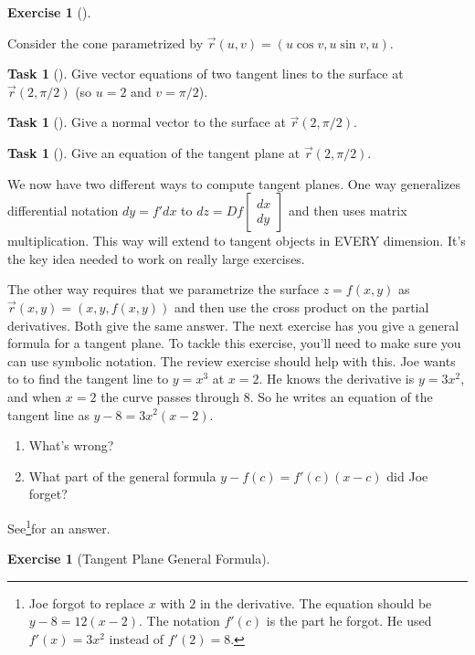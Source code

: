 \documentclass[10pt,]{book}
\theoremstyle{plain}
\theoremstyle{definition}
\theoremstyle{definition}
\theoremstyle{definition}
\theoremstyle{definition}
\newtheorem{exploration}[project]{Exercise}
\newtheorem{task}[project]{Task}
\theoremstyle{definition}
\numberwithin{equation}{section}
\begin{document}
\begin{exploration}[]\label{exploration-147}
%
\par
Consider the cone parametrized by \(\vec r(u,v)=(u\cos v, u\sin v,u)\).%
\begin{task}[]\label{task-330}
Give vector equations of two tangent lines to the surface at \(\vec r(2,\pi/2)\) (so \(u=2\) and \(v=\pi/2\)).%
\end{task}
\begin{task}[]\label{task-331}
Give a normal vector to the surface at \(\vec r(2,\pi/2)\).%
\end{task}
\begin{task}[]\label{task-332}
Give an equation of the tangent plane at \(\vec r(2,\pi/2)\).%
\end{task}
\end{exploration}
We now have two different ways to compute tangent planes. One way generalizes differential notation \(dy=f'dx\) to \(dz = Df \begin{bmatrix}dx\\dy
\end{bmatrix}\) and then uses matrix multiplication. This way will extend to tangent objects in EVERY dimension. It's the key idea needed to work on really large exercises.%
\par
The other way requires that we parametrize the surface \(z=f(x,y)\) as \(\vec r(x,y)=(x,y,f(x,y))\) and then use the cross product on the partial derivatives. Both give the same answer. The next exercise has you give a general formula for a tangent plane. To tackle this exercise, you'll need to make sure you can use symbolic notation. The review exercise should help with this.%
Joe wants to to find the tangent line to \(y=x^3\) at \(x=2\). He knows the derivative is \(y=3x^2\), and when \(x=2\) the curve passes through \(8\). So he writes an equation of the tangent line as \(y-8=3x^2(x-2)\). \leavevmode%
\begin{enumerate}
\item\hypertarget{li-84}{}What's wrong?%
\item\hypertarget{li-85}{}What part of the general formula \(y-f(c) = f'(c) (x-c)\) did Joe forget?%
\end{enumerate}
%
 \par
See\footnote{Joe forgot to replace \(x\) with \(2\) in the derivative. The equation should be \(y-8=12(x-2)\).  The notation \(f'(c)\) is the part he forgot.  He used \(f'(x)=3x^2\) instead of \(f'(2)=8\).\label{fn-3}}for an answer.%
\begin{exploration}[Tangent Plane General Formula]\label{exploration-148}
\end{exploration}
\typeout{************************************************}
\typeout{************************************************}
\end{document}
